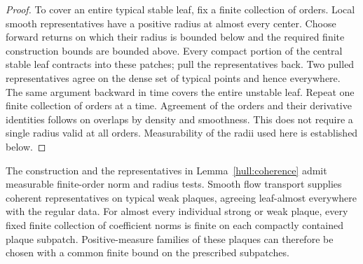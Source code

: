 \begin{proof}
To cover an entire typical stable leaf, fix a finite collection
of orders. Local smooth representatives have a positive radius
at almost every center. Choose forward returns on which their
radius is bounded below and the required finite construction
bounds are bounded above. Every compact portion of the central
stable leaf contracts into these patches; pull the representatives
back. Two pulled representatives agree on the dense set of
typical points and hence everywhere. The same argument backward
in time covers the entire unstable leaf. Repeat one finite
collection of orders at a time. Agreement of the orders and their
derivative identities follows on overlaps by density and smoothness.
This does not require a single radius valid at all orders.
Measurability of the radii used here is established below.
\end{proof}

\begin{lemma}\label{hull:measurability}
The construction and the representatives in
Lemma~\ref{hull:coherence} admit measurable finite-order norm and
radius tests. Smooth flow transport supplies coherent
representatives on typical weak plaques, agreeing leaf-almost
everywhere with the regular data. For almost every individual
strong or weak plaque, every fixed finite collection of coefficient
norms is finite on each compactly contained plaque subpatch.
Positive-measure families of these plaques can therefore be chosen
with a common finite bound on the prescribed subpatches.
\end{lemma}

